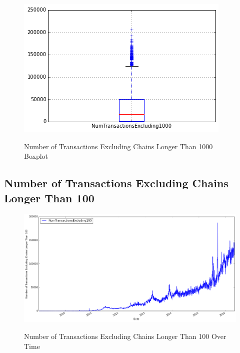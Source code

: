 \begin{figure}[bth]
  \myfloatalign
  {\includegraphics[width=1\linewidth]
    {gfx/n-transactions-excluding-chains-longer-than-1000-boxplot}}
  \caption{Number of Transactions Excluding Chains Longer Than 1000
    Boxplot}
  \label{fig:n-transactions-excluding-chains-longer-than-1000-boxplot}
\end{figure}

\clearpage

\subsection{Number of Transactions Excluding Chains Longer Than 100}
\label{sec:n-transactions-excluding-chains-longer-than-100}

\begin{figure}[bth]
  \myfloatalign
  {\includegraphics[width=1\linewidth]
    {gfx/n-transactions-excluding-chains-longer-than-100-over-time}}
  \caption{Number of Transactions Excluding Chains Longer Than 100
    Over Time}
  \label{fig:n-transactions-excluding-chains-longer-than-100-over-time}
\end{figure}

